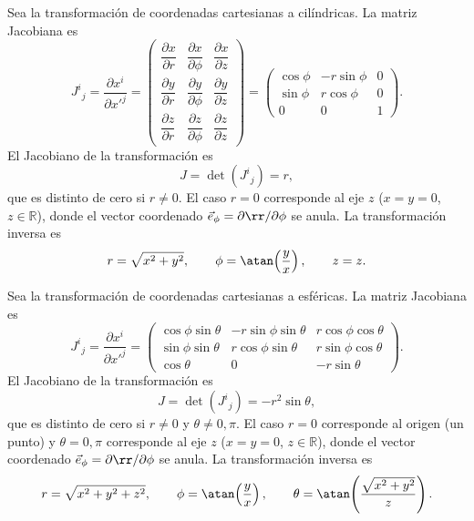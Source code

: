 \begin{ejemplo}
Sea la transformación de coordenadas cartesianas a cilíndricas. La matriz Jacobiana es
\begin{equation}
J^i{}_j = \frac{\partial x^i}{\partial x'^j} =
\begin{pmatrix}
\dfrac{\partial x}{\partial r} & \dfrac{\partial x}{\partial \phi} & \dfrac{\partial x}{\partial z} \\[6pt]
\dfrac{\partial y}{\partial r} & \dfrac{\partial y}{\partial \phi} & \dfrac{\partial y}{\partial z} \\[6pt]
\dfrac{\partial z}{\partial r} & \dfrac{\partial z}{\partial \phi} & \dfrac{\partial z}{\partial z}
\end{pmatrix}
=
\begin{pmatrix}
\cos\phi & -r\sin\phi & 0 \\
\sin\phi & r\cos\phi & 0 \\
0 & 0 & 1
\end{pmatrix}.
\end{equation}
El Jacobiano de la transformación es
\begin{equation}
J = \det\!\left(J^i{}_j\right) = r,
\end{equation}
que es distinto de cero si $r\neq 0$. El caso $r=0$ corresponde al eje $z$ ($x=y=0$, $z\in\mathbb{R}$), donde el vector coordenado $\vec e_\phi = \partial \rr/\partial\phi$ se anula. La transformación inversa es
\begin{equation}
r = \sqrt{x^2+y^2}, \qquad \phi = \atan\!\left(\frac{y}{x}\right), \qquad z=z .
\end{equation}
\end{ejemplo}

\begin{ejemplo}
Sea la transformación de coordenadas cartesianas a esféricas. La matriz Jacobiana es
\begin{equation}
J^i{}_j = \frac{\partial x^i}{\partial x'^j} =
\begin{pmatrix}
\cos\phi\sin\theta & -r\sin\phi\sin\theta & r\cos\phi\cos\theta \\
\sin\phi\sin\theta & r\cos\phi\sin\theta & r\sin\phi\cos\theta \\
\cos\theta & 0 & -r\sin\theta
\end{pmatrix}.
\end{equation}
El Jacobiano de la transformación es
\begin{equation}
J = \det\!\left(J^i{}_j\right) = -r^2\sin\theta,
\end{equation}
que es distinto de cero si $r\neq 0$ y $\theta\neq 0,\pi$. El caso $r=0$ corresponde al origen (un punto) y $\theta=0,\pi$ corresponde al eje $z$ ($x=y=0$, $z\in\mathbb{R}$), donde el vector coordenado $\vec e_\phi = \partial\rr/\partial\phi$ se anula. La transformación inversa es
\begin{equation}
r = \sqrt{x^2+y^2+z^2}, \qquad
\phi = \atan\!\left(\frac{y}{x}\right), \qquad
\theta = \atan\!\left(\frac{\sqrt{x^2+y^2}}{z}\right).
\end{equation}
\end{ejemplo}

